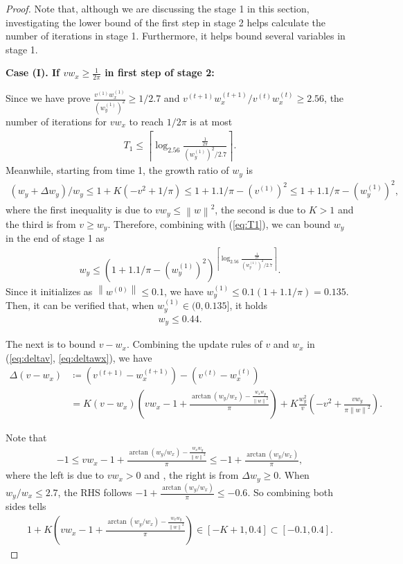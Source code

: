 \documentclass{article}
\theoremstyle{plain}
\theoremstyle{remark}
\newcommand{\norm}[1]{\left\lVert#1\right\rVert}
\newcommand{\T}[1]{^{(#1)}}
\def\t{^{(t)}}
\def\tt{^{(t+1)}}
\begin{document}
\begin{proof}
Note that, although we are discussing the stage 1 in this section, investigating the lower bound of the first step in stage 2 helps calculate the number of iterations in stage 1. Furthermore, it helps bound several variables in stage 1.

\textbf{Case (I). If $vw_x\ge\frac{1}{2\pi}$ in first step of stage 2:}

Since we have prove $\frac{v\T{1} w_x\T{1}}{(w_y\T{1})^2}\ge1/2.7$ and $v\tt w_x\tt/v\t w_x\t\ge 2.56$, the number of iterations for $vw_x$ to reach $1/2\pi$ is at most
\begin{align}
    T_1\le \left\lceil\log_{2.56}\frac{\frac{1}{2\pi}}{(w_y\T{1})^2/2.7}\right\rceil. \label{eq:T1}
\end{align}
Meanwhile, starting from time 1, the growth ratio of $w_y$ is
\begin{align}
    (w_y + \Delta w_y)/w_y\le 1+K(-v^2+1/\pi)\le 1+1.1/\pi-(v\T{1})^2\le 1+1.1/\pi-(w_y\T{1})^2,
\end{align}
where the first inequality is due to $vw_y\le\norm{w}^2$, the second is due to $K>1$ and the third is from $v\ge w_y$. Therefore, combining with (\ref{eq:T1}), we can bound $w_y$ in the end of stage 1 as
\begin{align}
    w_y\le \left(1+1.1/\pi-(w_y\T{1})^2\right)^{\left\lceil\log_{2.56}\frac{\frac{1}{2\pi}}{(w_y\T{1})^2/2.7}\right\rceil}.
\end{align}
Since it initializes as $\norm{w\T{0}}\le 0.1$, we have $w_y\T{1}\le 0.1(1+1.1/\pi)=0.135$. Then, it can be verified that, when $w_y\T{1}\in(0,0.135]$, it holds
\begin{align}
    w_y\le 0.44.
\end{align}

The next is to bound $v-w_x$. Combining the update rules of $v$ and $w_x$ in (\ref{eq:deltav}, \ref{eq:deltawx}), we have
\begin{align}
    \Delta(v-w_x) &\coloneqq (v\tt-w_x\tt)-(v\t-w_x\t) \nonumber \\
    &=K(v-w_x)\left(v w_x-1+\frac{\arctan(w_y/w_x)-\frac{w_x w_y}{\norm{w}^2}}{\pi}\right) + K\frac{w_y^2}{v}(-v^2+\frac{v w_y}{\pi\norm{w}^2}).\label{eq:deltavwx1}
\end{align}

Note that 
\begin{align}
    -1\le v w_x-1+\frac{\arctan(w_y/w_x)-\frac{w_x w_y}{\norm{w}^2}}{\pi} \le -1+\frac{\arctan(w_y/w_x)}{\pi},
\end{align}
where the left is due to $vw_x>0$ and  , the right is from $\Delta w_y\ge 0$. When $w_y/w_x\le2.7$, the RHS follows $-1+\frac{\arctan(w_y/w_x)}{\pi}\le -0.6$. So combining both sides tells
\begin{align}
    1+K\left(v w_x-1+\frac{\arctan(w_y/w_x)-\frac{w_x w_y}{\norm{w}^2}}{\pi}\right)\in[-K+1, 0.4]\subset [-0.1,0.4].\label{eq:deltavwx_coff}
\end{align}


\end{proof}
\end{document}
